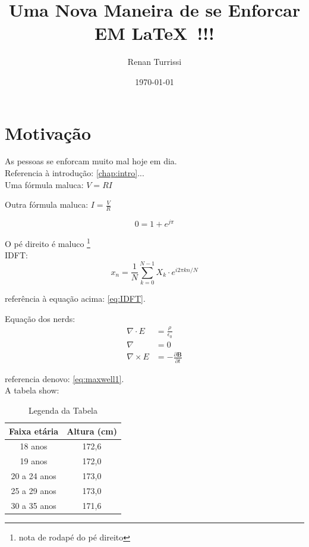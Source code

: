\documentclass{report}
\author{Renan Turrissi}
\date{\today}
\title{Uma Nova Maneira de se Enforcar EM \LaTeX\  !!!}
\newcommand{\vetor}[1]{\textbf{#1}}
\begin{document}
\maketitle



\chapter{Motivação}\label{chap:motiv}
As pessoas se enforcam muito mal hoje em dia.\\
Referencia à introdução: \ref{chap:intro}...\\
Uma fórmula maluca: $ V =RI $   

\hfill

Outra fórmula maluca: $ I = \frac{V}{R} $

$$ 0 = 1+e^{j\pi}  $$


O pé direito é maluco
\footnote[2]{nota de rodapé do pé direito}\\


IDFT: 
\begin{equation} \label{eq:IDFT}
 x_n = \frac{1}{N}\sum_{k=0}^{N-1} X_k \cdot e^{i2\pi kn/N} 
\end{equation}

referência à equação acima: \ref{eq:IDFT}.

Equação dos nerds:
\begin{align}
\label{eq:maxwell1}
\nabla \cdot E & = \frac{\rho}{\epsilon_0} \\
\nabla  & = 0 \\
\nabla \times E & = -\frac{\partial \vetor{B}}{\partial t}
\end{align}

referencia denovo: \ref{eq:maxwell1}. \\

A tabela show:

\begin{table}[!htb] \label{tab:TabelaShow}
	\centering
	\begin{tabular}{c|c}
	\hline
	
	Faixa etária & Altura (cm) \\ \hline
	18 anos & 172,6 \\
	19 anos & 172,0 \\
	20 a 24 anos & 173,0 \\
	25 a 29 anos & 173,0 \\
	30 a 35 anos & 171,6 \\
	\hline
	\end{tabular}
	\caption{Legenda da Tabela}
\end{table}
\end{document}
